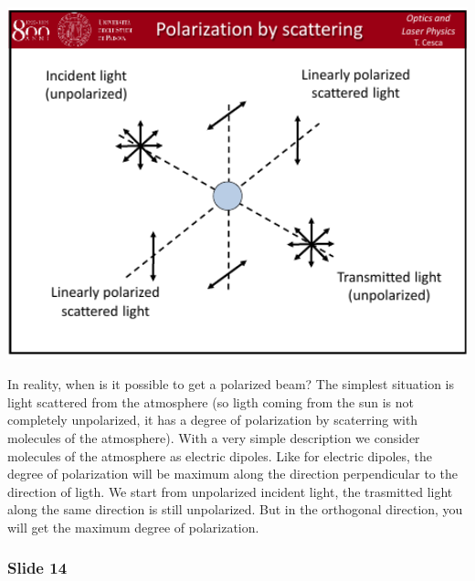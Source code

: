\documentclass[../main/main.tex]{subfiles}
\begin{document}
\begin{minipage}[]{0.5\linewidth}
\centering
\includegraphics[width=1\textwidth]{../lessons/pdf_file/02/02_S13.pdf}
\end{minipage}
\hspace{0.3cm}\vspace{0.3cm}
\begin{minipage}[c]{0.47\linewidth}
In reality, when is it possible to get a polarized beam? The simplest situation is light scattered from the atmosphere (so ligth coming from the sun is not completely unpolarized, it has a degree of polarization by scaterring with molecules of the atmosphere). With a very simple description we consider molecules of the atmosphere as electric dipoles. Like for electric dipoles, the degree of polarization will be maximum along the direction perpendicular to the direction of ligth. We start from unpolarized incident light, the trasmitted light along the same direction is still unpolarized. But in the orthogonal direction, you will get the maximum degree of polarization.
\end{minipage}

\subsubsection*{Slide 14}
\end{document}
